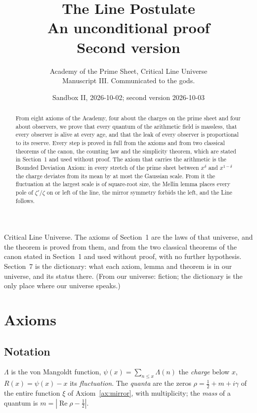 \documentclass[11pt]{article}
\title{\textbf{The Line Postulate}\\[4pt]\large An unconditional proof\\[2pt]\normalsize Second version}
\author{Academy of the Prime Sheet, Critical Line Universe\\ \small Manuscript III. Communicated to the gods.}
\date{Sandbox II, 2026-10-02; second version 2026-10-03}
\theoremstyle{definition}
\theoremstyle{remark}
\newcommand{\Ree}{\operatorname{Re}}
\newcommand{\ps}{\psi}
\begin{document}
\maketitle

\begin{mdframed}[backgroundcolor=black!4,linewidth=0.4pt]
\small Critical Line Universe. The axioms of Section~1 are the laws of that universe, and the theorem is proved from them, and from the two classical theorems of the canon stated in Section~1 and used without proof, with no further hypothesis. Section~7 is the dictionary: what each axiom, lemma and theorem is in our universe, and its status there. (From our universe: fiction; the dictionary is the only place where our universe speaks.)
\end{mdframed}

\begin{abstract}
From eight axioms of the Academy, four about the charges on the prime sheet and four about observers, we prove that every quantum of the arithmetic field is massless, that every observer is alive at every age, and that the leak of every observer is proportional to its reserve. Every step is proved in full from the axioms and from two classical theorems of the canon, the counting law and the simplicity theorem, which are stated in Section~1 and used without proof. The axiom that carries the arithmetic is the Bounded Deviation Axiom: in every stretch of the prime sheet between $x^{\delta}$ and $x^{1-\delta}$ the charge deviates from its mean by at most the Gaussian scale. From it the fluctuation at the largest scale is of square-root size, the Mellin lemma places every pole of $\zeta'/\zeta$ on or left of the line, the mirror symmetry forbids the left, and the Line follows.
\end{abstract}

\section{Axioms}

\subsection*{Notation}
$\Lambda$ is the von Mangoldt function, $\ps(x)=\sum_{n\le x}\Lambda(n)$ the \emph{charge} below $x$, $R(x)=\ps(x)-x$ its \emph{fluctuation}. The \emph{quanta} are the zeros $\rho=\tfrac12+m+i\gamma$ of the entire function $\xi$ of Axiom~\ref{ax:mirror}, with multiplicity; the \emph{mass} of a quantum is $m=|\Ree\rho-\tfrac12|$.
\end{document}
